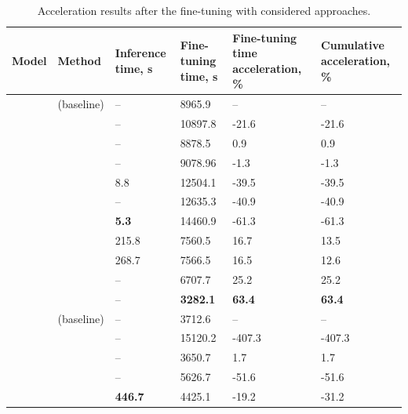 \begin{table}[t]
    \caption{Acceleration results after the fine-tuning with considered approaches.}
    \centering 
    \footnotesize
    \begin{tabularx}{0.99\textwidth}{AA|tatt}

        \toprule

        \bfseries Model &
        \bfseries Method & 
        \bfseries Inference time, s & 
        \bfseries Fine-tuning time, s & 
        \bfseries Fine-tuning time acceleration, \% & 
        \bfseries Cumulative acceleration, \%\\
        \midrule
        & \lora{} (baseline) & -- & 8965.9 & -- & --\\
        & \dora{} & -- & 10897.8 & -21.6 & -21.6 \\
        & \pissa{} & -- & 8878.5 & 0.9 & 0.9 \\
        & \adalora{} & -- & 9078.96 & -1.3 & -1.3 \\
        & \uidl{} & 8.8 & 12504.1 & -39.5 & -39.5 \\
        & \lisa{} & -- & 12635.3 & -40.9 & -40.9 \\
        & \ows{} & \bfseries 5.3 & 14460.9 & -61.3 & -61.3 \\
        & \sleb{} & 215.8 & 7560.5 & 16.7 &  13.5 \\
        & \shortllama{} & 268.7 & 7566.5 & 16.5 & 12.6 \\
        &  \ourmethodshort{} &  -- &  6707.7 &  25.2 &  25.2 \\
        &  \ourmethodshortconv{} &  -- &  \bfseries 3282.1 &  \bfseries 63.4 &  \bfseries 63.4 \\
        \midrule 
        & \lora{} (baseline) & -- & 3712.6 & -- & --\\
        & \dora{} & -- & 15120.2 & -407.3 & -407.3 \\
        & \pissa{} & -- & 3650.7 & 1.7 & 1.7 \\
        & \adalora{} & -- & 5626.7 & -51.6 & -51.6 \\
        & \uidl{} & \bfseries 446.7 & 4425.1 & -19.2 & -31.2 \\

\end{tabularx}
\end{table}
